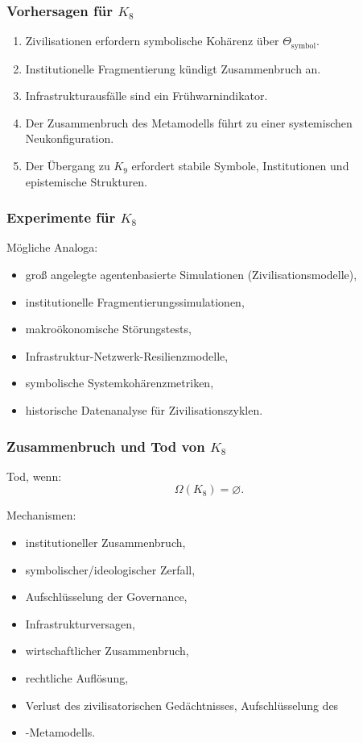 \subsubsection{Vorhersagen für \texorpdfstring{$K_8$}{K_8}}

\begin{enumerate}
    \item Zivilisationen erfordern symbolische Kohärenz über $\Theta_{\mathrm{symbol}}$.
    \item Institutionelle Fragmentierung kündigt Zusammenbruch an.
    \item Infrastrukturausfälle sind ein Frühwarnindikator.
    \item Der Zusammenbruch des Metamodells führt zu einer systemischen Neukonfiguration.
    \item Der Übergang zu $K_9$ erfordert stabile Symbole, Institutionen und epistemische Strukturen.
\end{enumerate}

\subsubsection{Experimente für \texorpdfstring{$K_8$}{K_8}}

Mögliche Analoga:
\begin{itemize}
    \item groß angelegte agentenbasierte Simulationen (Zivilisationsmodelle),
    \item institutionelle Fragmentierungssimulationen,
    \item makroökonomische Störungstests,
    \item Infrastruktur-Netzwerk-Resilienzmodelle,
    \item symbolische Systemkohärenzmetriken,
    \item historische Datenanalyse für Zivilisationszyklen.
\end{itemize}

\subsubsection{Zusammenbruch und Tod von \texorpdfstring{$K_8$}{K_8}}

Tod, wenn:
\[
\Omega(K_8)=\varnothing.
\]

Mechanismen:
\begin{itemize}
    \item institutioneller Zusammenbruch,
    \item symbolischer/ideologischer Zerfall,
    \item Aufschlüsselung der Governance,
    \item Infrastrukturversagen,
    \item wirtschaftlicher Zusammenbruch,
    \item rechtliche Auflösung,
    \item Verlust des zivilisatorischen Gedächtnisses,
    Aufschlüsselung des \item-Metamodells.
\end{itemize}

